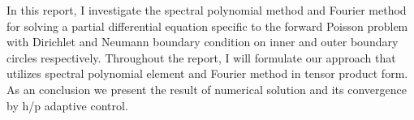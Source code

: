 In this report, I investigate the spectral polynomial method and
Fourier method for solving a partial differential equation
specific to the forward Poisson problem with Dirichlet and Neumann
boundary condition on inner and outer boundary circles
respectively. Throughout the report, I will  formulate our
approach that utilizes spectral polynomial element and Fourier
method in tensor product form. As an conclusion we present the
result of numerical solution and its convergence by h/p adaptive
control.
